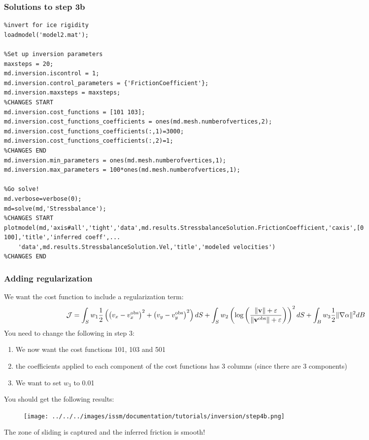 \subsubsection{Solutions to step 3b}
\begin{verbatim}%invert for ice rigidity
loadmodel('model2.mat');

%Set up inversion parameters
maxsteps = 20;
md.inversion.iscontrol = 1;
md.inversion.control_parameters = {'FrictionCoefficient'};
md.inversion.maxsteps = maxsteps;
%CHANGES START
md.inversion.cost_functions = [101 103];
md.inversion.cost_functions_coefficients = ones(md.mesh.numberofvertices,2);
md.inversion.cost_functions_coefficients(:,1)=3000;
md.inversion.cost_functions_coefficients(:,2)=1;
%CHANGES END
md.inversion.min_parameters = ones(md.mesh.numberofvertices,1);
md.inversion.max_parameters = 100*ones(md.mesh.numberofvertices,1);

%Go solve!
md.verbose=verbose(0);
md=solve(md,'Stressbalance');
%CHANGES START
plotmodel(md,'axis#all','tight','data',md.results.StressbalanceSolution.FrictionCoefficient,'caxis',[0 100],'title','inferred coeff',...
	'data',md.results.StressbalanceSolution.Vel,'title','modeled velocities')
%CHANGES END
\end{verbatim}

\subsubsection{Adding regularization}
We want the cost function to include a regularization term:
\begin{equation}
	{\mathcal J}
	=\int_{S} w_1 \dfrac{1}{2}\left(
	\left(v_x-v_x^{\text{obs}}\right)^{2}
	+\left(v_y-v_y^{\text{obs}}\right)^{2}
	\right) dS
	+\int_{S} w_2 \left(\text{log}\left(
	\dfrac{\|{\bf v}\|+\varepsilon}{\|{\bf v}^{\text{obs}}\|+\varepsilon}
	\right) \right)^2 dS
	+\int_{B} w_3
	\dfrac{1}{2} \|\nabla \alpha \|^{2}
	dB
\end{equation}
You need to change the following in step 3:
\begin{enumerate}
	\item We now want the cost functions 101, 103 and 501
	\item the coefficients applied to each component of the cost functions has 3 columns (since there are 3 components)
	\item We want to set $w_3$ to 0.01
\end{enumerate}
You should get the following results:
\begin{figure}[H]
	\begin{center}
		\texttt{[image: ../../../images/issm/documentation/tutorials/inversion/step4b.png]}
	\end{center}
\end{figure}
The zone of sliding is captured and the inferred friction is smooth!

